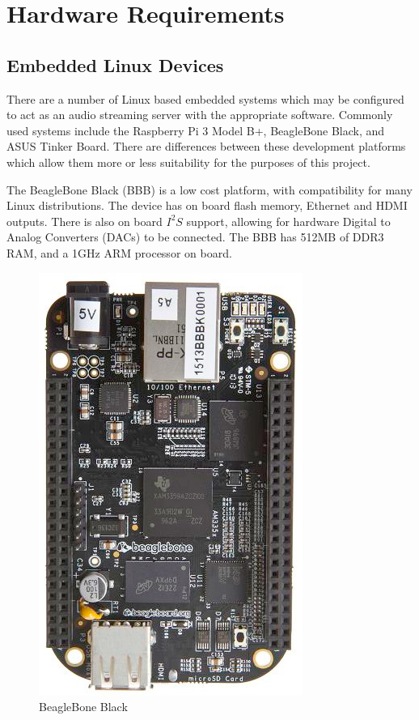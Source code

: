 \documentclass[11pt,a4paper]{scrreprt}
\begin{document}
\section{Hardware Requirements}\label{hardware-requirements}

\subsection{Embedded Linux Devices}\label{embedded-linux-devices}

There are a number of Linux based embedded systems which may be
configured to act as an audio streaming server with the appropriate
software. Commonly used systems include the Raspberry Pi 3 Model B+,
BeagleBone Black, and ASUS Tinker Board. There are differences between
these development platforms which allow them more or less suitability
for the purposes of this project.

The BeagleBone Black (BBB) is a low cost platform, with compatibility
for many Linux distributions. The device has on board flash memory,
Ethernet and HDMI outputs. There is also on board \(I^2S\) support,
allowing for hardware Digital to Analog Converters (DACs) to be
connected. The BBB has 512MB of DDR3 RAM, and a 1GHz ARM processor on
board\cite{BBB18}.

\begin{figure}[H]
\includegraphics{BackgroundLitSurvey/BBB.jpg}
\centering
\caption{BeagleBone Black\cite{BBB18}}
\label{BBBFig}
\end{figure}
\end{document}
